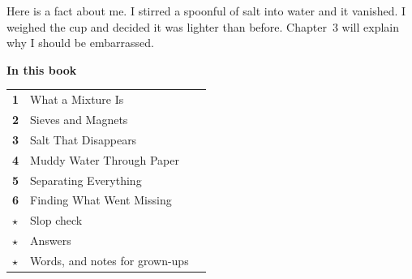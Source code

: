 \begin{multix}[hmm]\multixbot[hmm]\tcblower
Here is a fact about me. I stirred a spoonful of salt into water and it vanished. I weighed the cup and decided it was lighter than before. Chapter~3 will explain why I should be embarrassed.
\end{multix}
\clearpage

\thispagestyle{plain}
{\sans\bfseries\LARGE\color{ink} In this book}\par\vspace{0.2cm}
{\sans\large
\begin{tabular}{@{}p{0.9cm}p{7.6cm}r@{}}
\textcolor{tangerine}{\bfseries 1} & What a Mixture Is & \pageref{ch1}\\[3pt]
\textcolor{tangerine}{\bfseries 2} & Sieves and Magnets & \pageref{ch2}\\[3pt]
\textcolor{tangerine}{\bfseries 3} & Salt That Disappears & \pageref{ch3}\\[3pt]
\textcolor{tangerine}{\bfseries 4} & Muddy Water Through Paper & \pageref{ch4}\\[3pt]
\textcolor{tangerine}{\bfseries 5} & Separating Everything & \pageref{ch5}\\[3pt]
\textcolor{tangerine}{\bfseries 6} & Finding What Went Missing & \pageref{ch6}\\[3pt]
\textcolor{sky}{\bfseries $\star$} & Slop check & \pageref{slop}\\[3pt]
\textcolor{sky}{\bfseries $\star$} & Answers & \pageref{answers}\\[3pt]
\textcolor{sky}{\bfseries $\star$} & Words, and notes for grown-ups & \pageref{notes}\\
\end{tabular}}

